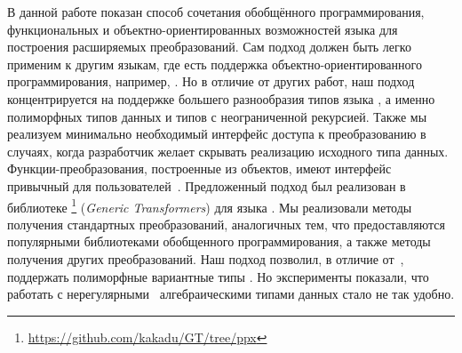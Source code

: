 \!\!\!В данной работе показан способ сочетания обобщённого программирования, функциональных и объектно-ориентированных возможностей  языка \OCaml{} для построения расширяемых преобразований. Сам подход должен быть легко применим  к другим языкам, где есть поддержка объектно-ориентированного программирования, например, \Scala{}.  
Но в отличие от других работ, наш подход концентрируется на поддержке большего разнообразия типов языка \OCaml{}, а именно полиморфных типов данных и типов с неограниченной рекурсией.
Также мы реализуем  минимально необходимый интерфейс доступа к преобразованию в  случаях, когда разработчик желает скрывать реализацию исходного типа данных.
Функции-преобразования, построенные из объектов, имеют интерфейс привычный для пользователей~\cite{ppxderiving}.
Предложенный подход был реализован в  библиотеке \GT{}\footnote{\url{https://github.com/kakadu/GT/tree/ppx}} (\emph{Generic Transformers}) для языка \ocaml{}. Мы  реализовали методы получения стандартных преобразований, аналогичных тем, что предоставляются популярными библиотеками обобщенного программирования, а также методы получения других преобразований.
Наш подход позволил, в отличие от~\cite{Visitors},  поддержать полиморфные вариантные типы  \ocaml{}. Но эксперименты показали, что  работать с нерегулярными~\cite{irregular} алгебраическими типами данных стало не так удобно.


